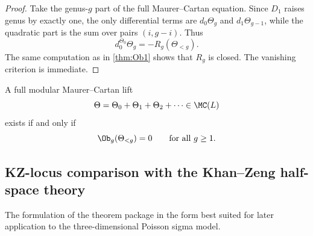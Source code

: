 \begin{proof}
Take the genus-$g$ part of the full Maurer--Cartan equation. Since $D_1$ raises genus by
exactly one, the only differential terms are $d_0\Theta_g$ and $d_1\Theta_{g-1}$, while the
quadratic part is the sum over pairs $(i,g-i)$. Thus
\[
d_0^{\Theta_0}\Theta_g=-R_g(\Theta_{<g}).
\]
The same computation as in \cref{thm:Ob1} shows that $R_g$ is closed. The vanishing
criterion is immediate.
\end{proof}

\begin{corollary}
A full modular Maurer--Cartan lift
\[
\Theta=\Theta_0+\Theta_1+\Theta_2+\cdots\in \MC(L)
\]
exists if and only if
\[
\Ob_g(\Theta_{<g})=0
\qquad\text{for all }g\ge 1.
\]
\end{corollary}

\subsection{KZ-locus comparison with the Khan--Zeng half-space theory}

The formulation of the theorem package in the form best suited for later application to the
three-dimensional Poisson sigma model.


